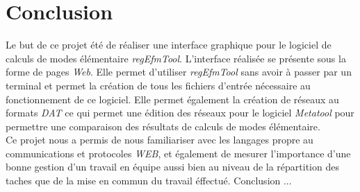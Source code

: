 \documentclass[12pt,a4paper]{report}
\begin{document}


\chapter*{Conclusion}
Le but de ce projet été de réaliser une interface graphique pour le logiciel de calculs de modes élémentaire \emph{regEfmTool}. L'interface réalisée se présente sous la forme de pages \emph{Web}. Elle permet d'utiliser \emph{regEfmTool} sans avoir à passer par un terminal et permet la création de tous les fichiers d'entrée nécessaire au fonctionnement de ce logiciel.
Elle permet également la création de réseaux au formats \emph{DAT} ce qui permet une édition des réseaux pour le logiciel \emph{Metatool} pour permettre une comparaison des résultats de calculs de modes élémentaire.\\

Ce projet nous a permis de nous familiariser avec les langages propre au communications et protocoles \emph{WEB}, et également de mesurer l'importance d'une bonne gestion d'un travail en équipe aussi bien au niveau de la répartition des taches que de la mise en commun du travail éffectué.
Conclusion ...



\end{document}

